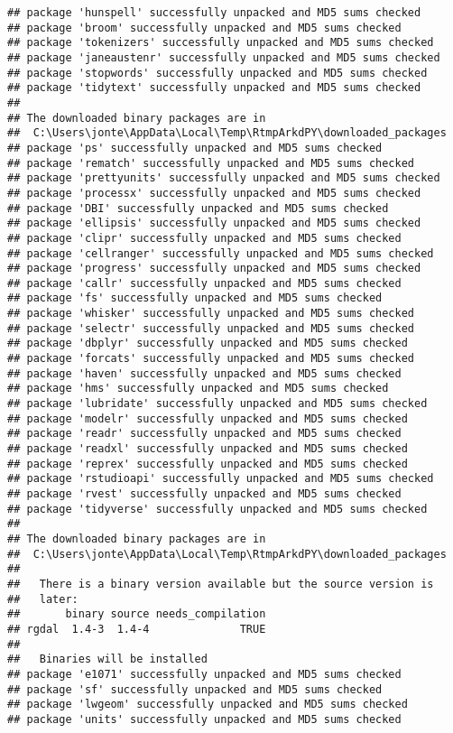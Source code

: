 \documentclass[]{article}
\begin{document}
\begin{verbatim}
## package 'hunspell' successfully unpacked and MD5 sums checked
## package 'broom' successfully unpacked and MD5 sums checked
## package 'tokenizers' successfully unpacked and MD5 sums checked
## package 'janeaustenr' successfully unpacked and MD5 sums checked
## package 'stopwords' successfully unpacked and MD5 sums checked
## package 'tidytext' successfully unpacked and MD5 sums checked
## 
## The downloaded binary packages are in
##  C:\Users\jonte\AppData\Local\Temp\RtmpArkdPY\downloaded_packages
## package 'ps' successfully unpacked and MD5 sums checked
## package 'rematch' successfully unpacked and MD5 sums checked
## package 'prettyunits' successfully unpacked and MD5 sums checked
## package 'processx' successfully unpacked and MD5 sums checked
## package 'DBI' successfully unpacked and MD5 sums checked
## package 'ellipsis' successfully unpacked and MD5 sums checked
## package 'clipr' successfully unpacked and MD5 sums checked
## package 'cellranger' successfully unpacked and MD5 sums checked
## package 'progress' successfully unpacked and MD5 sums checked
## package 'callr' successfully unpacked and MD5 sums checked
## package 'fs' successfully unpacked and MD5 sums checked
## package 'whisker' successfully unpacked and MD5 sums checked
## package 'selectr' successfully unpacked and MD5 sums checked
## package 'dbplyr' successfully unpacked and MD5 sums checked
## package 'forcats' successfully unpacked and MD5 sums checked
## package 'haven' successfully unpacked and MD5 sums checked
## package 'hms' successfully unpacked and MD5 sums checked
## package 'lubridate' successfully unpacked and MD5 sums checked
## package 'modelr' successfully unpacked and MD5 sums checked
## package 'readr' successfully unpacked and MD5 sums checked
## package 'readxl' successfully unpacked and MD5 sums checked
## package 'reprex' successfully unpacked and MD5 sums checked
## package 'rstudioapi' successfully unpacked and MD5 sums checked
## package 'rvest' successfully unpacked and MD5 sums checked
## package 'tidyverse' successfully unpacked and MD5 sums checked
## 
## The downloaded binary packages are in
##  C:\Users\jonte\AppData\Local\Temp\RtmpArkdPY\downloaded_packages
## 
##   There is a binary version available but the source version is
##   later:
##       binary source needs_compilation
## rgdal  1.4-3  1.4-4              TRUE
## 
##   Binaries will be installed
## package 'e1071' successfully unpacked and MD5 sums checked
## package 'sf' successfully unpacked and MD5 sums checked
## package 'lwgeom' successfully unpacked and MD5 sums checked
## package 'units' successfully unpacked and MD5 sums checked

\end{verbatim}
\end{document}
